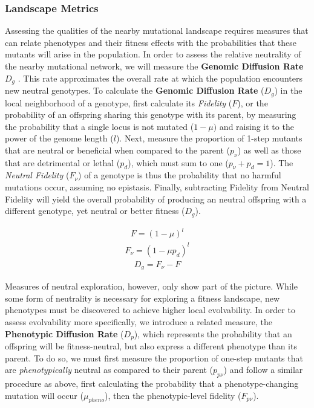 \documentclass[10pt,letterpaper]{article}
\begin{document}
\subsubsection*{Landscape Metrics}
Assessing the qualities of the nearby mutational landscape requires measures that can relate phenotypes and their fitness effects with the probabilities that these mutants will arise in the population. In order to assess the relative neutrality of the nearby mutational network, we will measure the \textbf{Genomic Diffusion Rate} $D_g$ \cite{ofria_evolution_2002}. This rate approximates the overall rate at which the population encounters new neutral genotypes.
To calculate the \textbf{Genomic Diffusion Rate} ($D_g$) in the local neighborhood of a genotype, first calculate its \textit{Fidelity} ($F$), or the probability of an offspring sharing this genotype with its parent, by measuring the probability that a single locus is not mutated ($1-\mu)$ and raising it to the power of the genome length ($l$). Next, measure the proportion of 1-step mutants that are neutral or beneficial when compared to the parent ($p_\nu$) as well as those that are detrimental or lethal ($p_d$), which must sum to one ($p_\nu + p_d = 1$).  The \textit{Neutral Fidelity} ($F_\nu$) of a genotype is thus the probability that no harmful mutations occur, assuming no epistasis. Finally, subtracting Fidelity from Neutral Fidelity will yield the overall probability of producing an neutral offspring with a different genotype, yet neutral or better fitness ($D_g$).

	\begin{eqnarray}
	\label{eq:fidelity}
		F = (1 - \mu)^l
	\end{eqnarray}
	\begin{eqnarray}
	\label{eq:neutral_fidelity}
		F_\nu = (1 - \mu p_d)^l
	\end{eqnarray}
	\begin{eqnarray}
	\label{eq:genomic_diffusion_rate}
		D_g = F_\nu - F
	\end{eqnarray}

Measures of neutral exploration, however, only show part of the picture. While some form of neutrality is necessary for exploring a fitness landscape, new phenotypes must be discovered to achieve higher local evolvability. In order to assess evolvability more specifically, we introduce a related measure, the \textbf{Phenotypic Diffusion Rate} ($D_p$), which represents the probability that an offspring will be fitness-neutral, but also express a different phenotype than its parent. To do so, we must first measure the proportion of one-step mutants that are \textit{phenotypically} neutral as compared to their parent ($p_{p\nu}$) and follow a similar procedure as above, first calculating the probability that a phenotype-changing mutation will occur ($\mu_{pheno}$), then the phenotypic-level fidelity ($F_{p\nu}$).
\end{document}
